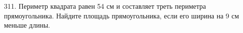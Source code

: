 311. Периметр квадрата равен 54 см и составляет треть периметра прямоугольника. Найдите площадь прямоугольника, если его ширина на 9 см меньше длины.\\
